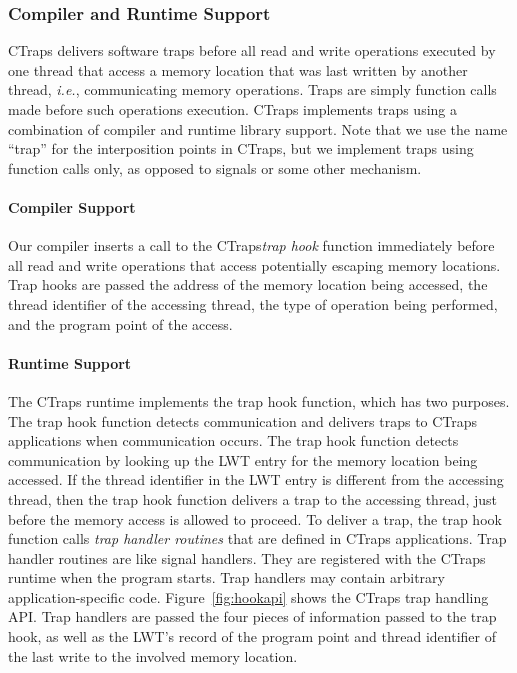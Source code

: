 \documentclass[preprint,9pt]{sigplanconf}
\newcommand{\ctraps}{CTraps\xspace}
\newcommand{\lwt}{LWT\xspace}
\begin{document}
\subsubsection{Compiler and Runtime Support} 

\ctraps delivers software traps before all read and write operations executed
by one thread that access a memory location that was last written by another
thread, {\em i.e.}, communicating memory operations.  Traps are simply function
calls made before such operations execution.  \ctraps implements traps using a
combination of compiler and runtime library support.  Note that we use the name
``trap'' for the interposition points in \ctraps, but we implement traps using 
function calls only, as opposed to signals or some other mechanism. 

\paragraph{Compiler Support}
Our compiler inserts a call to the \ctraps {\em trap hook} function immediately
before all read and write operations that access potentially escaping memory
locations.  Trap hooks are passed the address of the memory location being
accessed, the thread identifier of the accessing thread, the type of operation
being performed, and the program point of the access.  

\paragraph{Runtime Support}
The \ctraps runtime implements the trap hook function,  which has two purposes.
The trap hook function detects communication and delivers traps to \ctraps
applications when communication occurs.  The trap hook function detects
communication by looking up the \lwt entry for the memory location being
accessed.  If the thread identifier in the \lwt entry is different from the
accessing thread, then the trap hook function delivers a trap to the accessing
thread, just before the memory access is allowed to proceed.  To deliver a
trap, the trap hook function calls {\em trap handler routines} that are defined
in \ctraps applications.  Trap handler routines are like signal handlers.  They
are registered with the \ctraps runtime when the program starts.  Trap handlers
may contain arbitrary application-specific code.  Figure~\ref{fig:hookapi}
shows the \ctraps trap handling API.  Trap handlers are passed the four pieces
of information passed to the trap hook, as well as the \lwt's record of the
program point and thread identifier of the last write to the involved memory
location.
\end{document}
